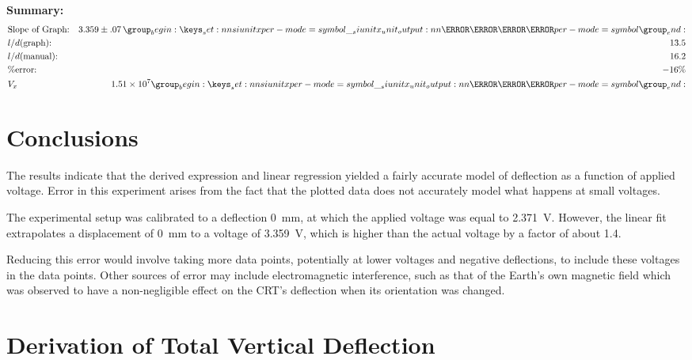 \documentclass[twocolumn,english]{IEEEtran}
\theoremstyle{plain}
\theoremstyle{plain}
\begin{document}
  \hrulefill

  \textbf{Summary:}
  \begin{align*}
   &\text{Slope of Graph:} 	& 3.359 \pm .07 \,\si[per-mode=symbol]{\milli\metre\per\volt} \\
   &l/d \text{(graph):} 	& 13.5 \\
   &l/d \text{(manual):} 	& 16.2 \\
   & \%\text{error:} 		& -16\% \\
   &V_x 			& 1.51 \times 10^7 \si[per-mode=symbol]{\metre\per\second}\\
  \end{align*}
  \hrulefill



\section{Conclusions}

The results indicate that the derived expression and linear regression yielded a fairly accurate model of deflection as a function of applied voltage.
Error in this experiment arises from the fact that the plotted data does not accurately model what happens at small voltages.

The experimental setup was calibrated to a deflection \SI{0}{\milli\metre}, at which the applied voltage was equal to \SI{2.371}{\volt}.
However, the linear fit extrapolates a displacement of \SI{0}{\milli\metre} to a voltage of \SI{3.359}{\volt}, which is higher than the actual voltage by a factor of about \num{1.4}.

Reducing this error would involve taking more data points, potentially at lower voltages and negative deflections, to include these voltages in the data points.
Other sources of error may include electromagnetic interference, such as that of the Earth's own magnetic field which was observed to have a non-negligible effect on the CRT's deflection when its orientation was changed.


\appendices{}

\section{Derivation of Total Vertical Deflection}\label{deriv}
\end{document}

